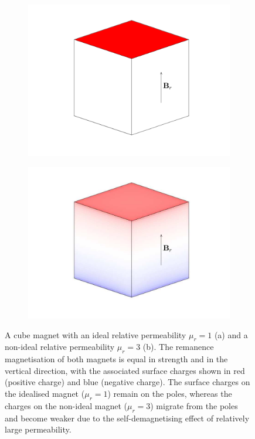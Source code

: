\begin{figure}
    \centering
    \begin{subfigure}{0.7\textwidth}
        \centering
        \includegraphics[width=\linewidth]{p4/p4FIG1a}
        \caption{}\label{fig:p4singleMagnetIdealised}
    \end{subfigure}
    \begin{subfigure}{0.7\textwidth}
        \centering
        \includegraphics[width=\linewidth]{p4/p4FIG1b}
        \caption{}\label{fig:p4singleMagnetNonideal}
    \end{subfigure}
    \caption{A cube magnet with an ideal relative permeability \(\mu_r = 1\) (a) and a non-ideal relative permeability \(\mu_r = 3\) (b). The remanence magnetisation of both magnets is equal in strength and in the vertical direction, with the associated surface charges shown in red (positive charge) and blue (negative charge). The surface charges on the idealised magnet (\(\mu_r = 1\)) remain on the poles, whereas the charges on the non-ideal magnet (\(\mu_r = 3\)) migrate from the poles and become weaker due to the self-demagnetising effect of relatively large permeability.}
    \label{fig:p4singleMagnetPicture}
\end{figure}
%

